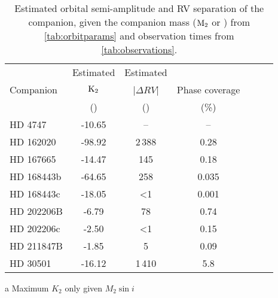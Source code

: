 \begin{table*}
    \small
    \centering
    \begin{threeparttable}[b]
        \caption{Estimated orbital semi-amplitude and {RV} separation of the companion, given the companion mass (\(\textrm{M}_{2}\) or \mtwosini{}) from \cref{tab:orbitparams} and observation times from \cref{tab:observations}.}
        \begin{tabular}{l c c c c c c}%
            \toprule
             & Estimated & Estimated & & \\  %
             Companion & \(\rm K_2\) & |\(\Delta {RV}\)| & Phase coverage\\
             & (\kmps{}) & (\mps{}) & (\%)\\
             \midrule
             {HD 4747} & -10.65 & -- & --\\  %
             {HD 162020} & -98.92\tnote{a} & 2\,388 & 0.28\\  %
             {HD 167665} & -14.47\tnote{a} & 145 & 0.18\\  %
             {HD 168443b} & -64.65\tnote{a} & 258 & 0.035\\
             {HD 168443c} & -18.05\tnote{a} & <1 & 0.001\\  %
             {HD 202206}B & -6.79 & 78 & 0.74\\  %
             {HD 202206}c & -2.50 & <1 & 0.15\\  %
             {HD 211847}B & -1.85 & 5 & 0.09\\  %
             {HD 30501} & -16.12 & 1\,410 & 5.8\\
             \bottomrule
         \end{tabular}\label{tab:estimated_rv}
         \begin{tablenotes}
            \item[a] {Maximum \(K_2\) only given \(M_2 \sin{i}\)}
         \end{tablenotes}
    \end{threeparttable}
\end{table*}
